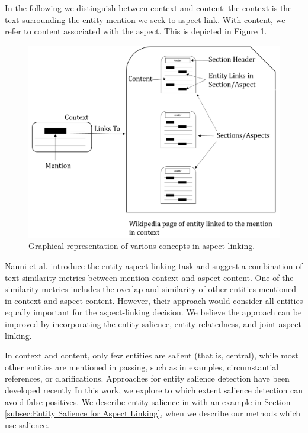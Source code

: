 In the following we distinguish between context and content: the context is the text surrounding the entity mention we seek to aspect-link. With content, we refer to content associated with the aspect. This is depicted in Figure \ref{fig:context-vs-content}.

\begin{figure}
    \centering
    \includegraphics [scale=0.6]{context-and-content.png}
    \caption{Graphical representation of various concepts in aspect linking.}
    \label{fig:context-vs-content}
\end{figure}

Nanni et al. \cite{nanni2018entity} introduce the entity aspect linking task and suggest a combination of text similarity metrics between mention context and aspect content. One of the similarity metrics includes the overlap and similarity of other entities mentioned in context and aspect content. However, their approach would consider all entities equally important for the aspect-linking decision. We believe the approach can be improved by incorporating the entity salience, entity relatedness, and joint aspect linking.  

In context and content, only few entities are salient (that is, central), while most other entities are mentioned in passing, such as in examples, circumstantial references, or clarifications. Approaches for entity salience detection have been developed  recently \cite{dunietz-gillick-2014-new, xiong2018towards, swat} %
In this work, we explore to which extent salience detection can avoid false positives. We describe entity salience in with an example in Section \ref{subsec:Entity Salience for Aspect Linking}, when we describe our methods which use salience.

